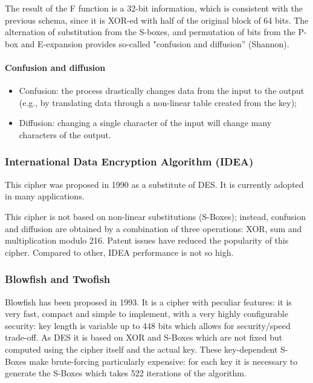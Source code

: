 
The result of the F function is a 32-bit information, which is consistent with the previous schema, since it is XOR-ed with half of the original block of 64 bits. The alternation of substitution from the S-boxes, and permutation of bits from the P-box and E-expansion provides so-called "confusion and diffusion” (Shannon).

\paragraph{Confusion and diffusion}

\begin{itemize}
    \item Confusion: the process drastically changes data from the input to the output (e.g., by translating data through a non-linear table created from the key);
    \item Diffusion: changing a single character of the input will change many characters of the output.
\end{itemize}

\subsubsection{International Data Encryption Algorithm (IDEA)}
This cipher was proposed in 1990 as a substitute of DES. It is currently adopted in many applications. 

This cipher is not based on non-linear substitutions (S-Boxes); instead, confusion and diffusion are obtained by a combination of three operations: XOR, sum and multiplication modulo 216. Patent issues have reduced the popularity of this cipher. Compared to other, IDEA performance is not so high.

\subsubsection{Blowfish and Twofish }
Blowfish has been proposed in 1993. It is a cipher with peculiar features: it is very fast, compact and simple to implement, with a very highly configurable security: key length is variable up to 448 bits which allows for security/speed trade-off. As DES it is based on XOR and S-Boxes which are not fixed but computed using the cipher itself and the actual key. These key-dependent S-Boxes make brute-forcing particularly expensive: for each key it is necessary to generate the S-Boxes which takes 522 iterations of the algorithm.

